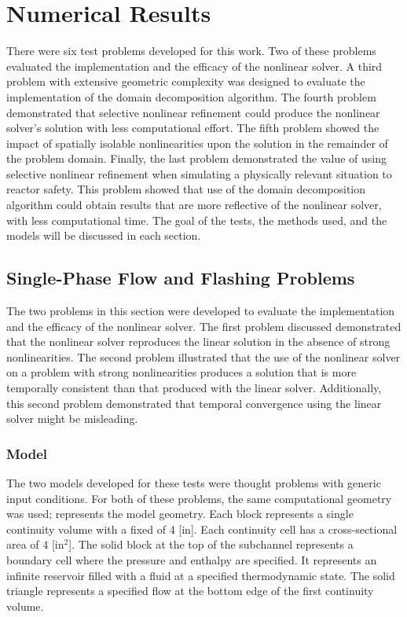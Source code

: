 \chapter{Numerical Results}
\label{chap:results}

There were six test problems developed for this work.
Two of these problems evaluated the implementation and the efficacy of the nonlinear solver.
A third problem with extensive geometric complexity was designed to evaluate the implementation of the domain decomposition algorithm.
The fourth problem demonstrated that selective nonlinear refinement could produce the nonlinear solver's solution with less computational effort.
The fifth problem showed the impact of spatially isolable nonlinearities upon the solution in the remainder of the problem domain.
Finally, the last problem demonstrated the value of using selective nonlinear refinement when simulating a physically relevant situation to reactor safety.
This problem showed that use of the domain decomposition algorithm could obtain results that are more reflective of the nonlinear solver, with less computational time.
The goal of the tests, the methods used, and the models will be discussed in each section.

\section{Single-Phase Flow and Flashing Problems}
\label{sect:single_phase_and_flashing}

The two problems in this section were developed to evaluate the implementation and the efficacy of the nonlinear solver.
The first problem discussed demonstrated that the nonlinear solver reproduces the linear solution in the absence of strong nonlinearities.
The second problem illustrated that the use of the nonlinear solver on a problem with strong nonlinearities produces a solution that is more temporally consistent than that produced with the linear solver.
Additionally, this second problem demonstrated that temporal convergence using the linear solver might be misleading.

\subsection{Model}
\label{subsect:single_model}
The two models developed for these tests were thought problems with generic input conditions.
For both of these problems, the same computational geometry was used;   represents the model geometry.
Each block represents a single continuity volume with a fixed \dx{} of 4 [in].
Each continuity cell has a cross-sectional area of 4 [in$^2$].
The solid block at the top of the subchannel represents a boundary cell where the pressure and enthalpy are specified.
It represents an infinite reservoir filled with a fluid at a specified thermodynamic state.
The solid triangle represents a specified flow at the bottom edge of the first continuity volume. 

